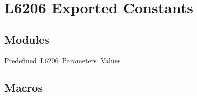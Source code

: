 \hypertarget{group___l6206___exported___constants}{}\section{L6206 Exported Constants}
\label{group___l6206___exported___constants}
\subsection*{Modules}
\begin{DoxyCompactItemize}
\item 
\mbox{\hyperlink{group___predefined___l6206___parameters___values}{Predefined L6206 Parameters Values}}
\end{DoxyCompactItemize}
\subsection*{Macros}
